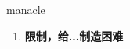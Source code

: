 
\begin{frame}
{\huge manacle}
\begin{center}
\begin{enumerate}\Large
  \item \textbf{限制，给...制造困难}
\end{enumerate}
\end{center}
\end{frame}
